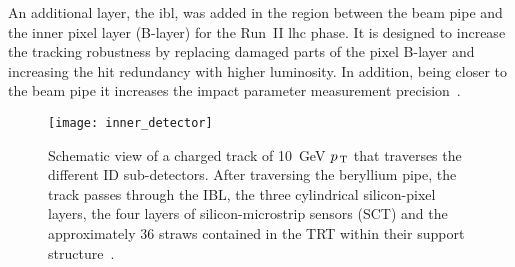 An additional layer, the \gls{ibl}, was added in the region between the beam
pipe and the inner pixel layer (B-layer) for the Run~II \gls{lhc} phase. It is
designed to increase the tracking robustness by replacing damaged parts of the
pixel B-layer and increasing the hit redundancy with higher luminosity. In
addition, being closer to the beam pipe it increases the impact parameter
measurement precision~\cite{IBL}.
\begin{figure}[!h]
  \centering
    \texttt{[image: inner\_detector]}
    \caption{Schematic view of a charged track of 10~GeV $p_\mathrm{\, T}$ that traverses
      the different ID sub-detectors. After traversing the beryllium pipe, the
      track passes through the IBL, the three cylindrical silicon-pixel layers,
      the four layers of silicon-microstrip sensors (SCT) and the approximately
      36 straws contained in the TRT within their support
      structure~\cite{InnerDetectorPlotIBL}.}
    \label{fig:id}
\end{figure}
